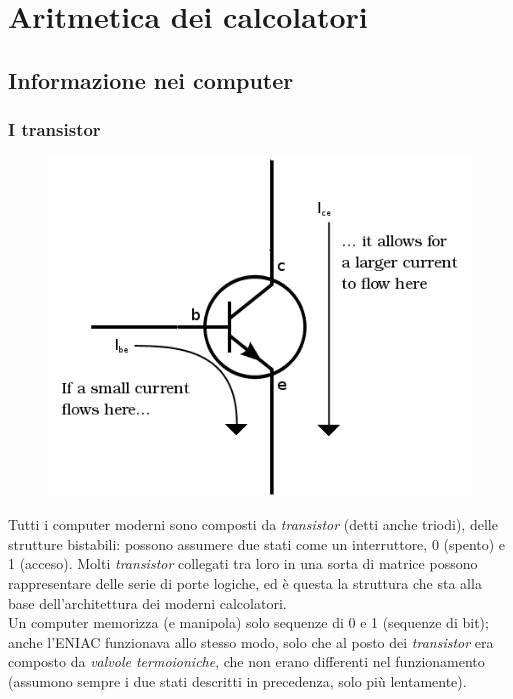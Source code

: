 \documentclass[class=book, crop=false]{standalone}
\begin{document}
\chapter{Aritmetica dei calcolatori}

\section{Informazione nei computer}

\subsection{I transistor}

\begin{figure}
	\includegraphics[width=0.9\linewidth]{transistor.png}
	\label{fig:transistor}
	\centering
\end{figure}

Tutti i computer moderni sono composti da \emph{transistor} (detti anche triodi), delle strutture bistabili: possono assumere due stati come un interruttore, 0 (spento) e 1 (acceso). Molti \emph{transistor} collegati tra loro in una sorta di matrice possono rappresentare delle serie di porte logiche, ed è questa la struttura che sta alla base dell'architettura dei moderni calcolatori.\\
Un computer memorizza (e manipola) solo sequenze di 0 e 1 (sequenze di bit); anche l’ENIAC funzionava allo stesso modo, solo che al posto dei \emph{transistor} era composto da \emph{valvole termoioniche}, che non erano differenti nel funzionamento (assumono sempre i due stati descritti in precedenza, solo più lentamente).
\end{document}

